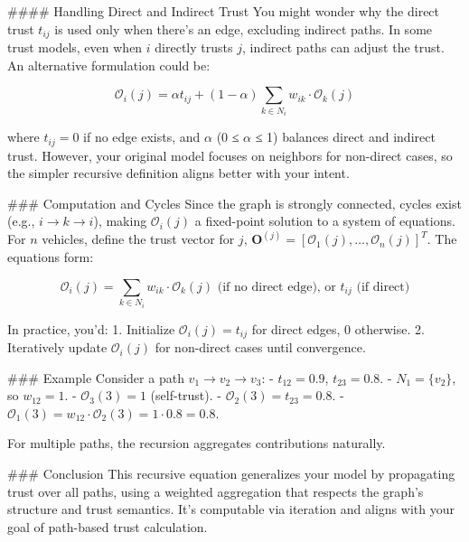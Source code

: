 \documentclass{article}
\begin{document}
#### Handling Direct and Indirect Trust
You might wonder why the direct trust \( t_{ij} \) is used only when there’s an edge, excluding indirect paths. In some trust models, even when \( i \) directly trusts \( j \), indirect paths can adjust the trust. An alternative formulation could be:

\[ \mathcal{O}_i(j) = \alpha t_{ij} + (1 - \alpha) \sum_{k \in N_i} w_{ik} \cdot \mathcal{O}_k(j) \]

where \( t_{ij} = 0 \) if no edge exists, and \( \alpha \) (0 ≤ \( \alpha \) ≤ 1) balances direct and indirect trust. However, your original model focuses on neighbors for non-direct cases, so the simpler recursive definition aligns better with your intent.

### Computation and Cycles
Since the graph is strongly connected, cycles exist (e.g., \( i \to k \to i \)), making \( \mathcal{O}_i(j) \) a fixed-point solution to a system of equations. For \( n \) vehicles, define the trust vector for \( j \), \( \mathbf{O}^{(j)} = [\mathcal{O}_1(j), \ldots, \mathcal{O}_n(j)]^T \). The equations form:

\[ \mathcal{O}_i(j) = \sum_{k \in N_i} w_{ik} \cdot \mathcal{O}_k(j) \text{ (if no direct edge), or } t_{ij} \text{ (if direct)} \]

In practice, you’d:
1. Initialize \( \mathcal{O}_i(j) = t_{ij} \) for direct edges, 0 otherwise.
2. Iteratively update \( \mathcal{O}_i(j) \) for non-direct cases until convergence.

### Example
Consider a path \( v_1 \to v_2 \to v_3 \):
- \( t_{12} = 0.9 \), \( t_{23} = 0.8 \).
- \( N_1 = \{v_2\} \), so \( w_{12} = 1 \).
- \( \mathcal{O}_3(3) = 1 \) (self-trust).
- \( \mathcal{O}_2(3) = t_{23} = 0.8 \).
- \( \mathcal{O}_1(3) = w_{12} \cdot \mathcal{O}_2(3) = 1 \cdot 0.8 = 0.8 \).

For multiple paths, the recursion aggregates contributions naturally.

### Conclusion
This recursive equation generalizes your model by propagating trust over all paths, using a weighted aggregation that respects the graph’s structure and trust semantics. It’s computable via iteration and aligns with your goal of path-based trust calculation.
\end{document}
